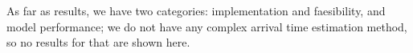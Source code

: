 As far as results, we have two categories:
implementation and faesibility,
and model performance;
we do not have any complex arrival time estimation method,
so no results for that are shown here.





